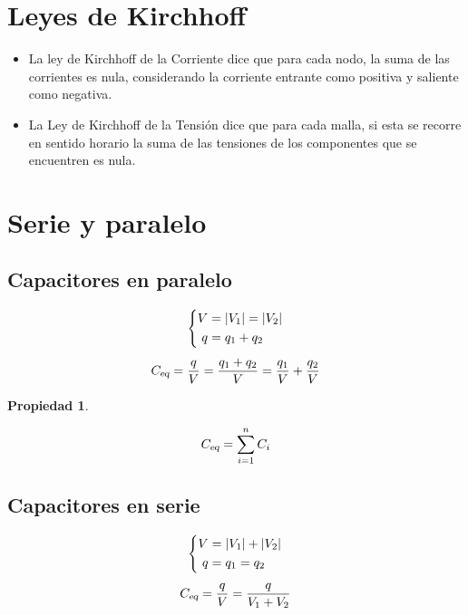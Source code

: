 \documentclass[a5paper,12pt,twoside]{book}
\newtheorem{prop}{{Propiedad}}[chapter]
\begin{document}
\section{Leyes de Kirchhoff}

\begin{itemize}
\item La ley de Kirchhoff de la Corriente dice que para cada nodo, la suma de las corrientes es nula, considerando la corriente entrante como positiva y saliente como negativa.

\item La Ley de Kirchhoff de la Tensión dice que para cada malla, si esta se recorre en sentido horario la suma de las tensiones de los componentes que se encuentren es nula.
\end{itemize}


\section{Serie y paralelo}


\subsection{Capacitores en paralelo}

\begin{gather*}
    \left\{
    \begin{aligned}
        V &= {\left| {V_1} \right|} = {\left| {V_2} \right|}
        \\
        q &= q_1 + q_2
    \end{aligned}
    \right.
    \\[1ex]
    {{C}_\textsl{{eq}}} = \frac{q}{V} = \frac{q_1 + q_2}{V} = \frac{q_1}{V} + \frac{q_2}{V}
\end{gather*}

\begin{mdframed}[style=MyFrame1]
    \begin{prop}
    \end{prop}
    \begin{equation*}
        {{C}_\textsl{{eq}}} = \sum_{i=1}^n C_i
    \end{equation*}
\end{mdframed}


\subsection{Capacitores en serie}

\begin{gather*}
    \left\{
    \begin{aligned}
        V &= {\left| {V_1} \right|} + {\left| {V_2} \right|}
        \\
        q &= q_1 = q_2
    \end{aligned}
    \right.
    \\[1ex]
    {{C}_\textsl{{eq}}} = \frac{q}{V} = \frac{q}{V_1 + V_2}
\end{gather*}
\end{document}
